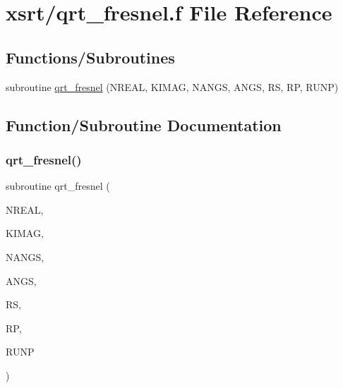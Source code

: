 \hypertarget{qrt__fresnel_8f}{}\section{xsrt/qrt\+\_\+fresnel.f File Reference}
\label{qrt__fresnel_8f}
\subsection*{Functions/\+Subroutines}
\begin{DoxyCompactItemize}
\item 
subroutine \hyperlink{qrt__fresnel_8f_af0d3a92968dea32a5708d958e28775b0}{qrt\+\_\+fresnel} (N\+R\+E\+AL, K\+I\+M\+AG, N\+A\+N\+GS, A\+N\+GS, RS, RP, R\+U\+NP)
\end{DoxyCompactItemize}


\subsection{Function/\+Subroutine Documentation}
\mbox{\label{qrt__fresnel_8f_af0d3a92968dea32a5708d958e28775b0}} 
\subsubsection{\texorpdfstring{qrt\+\_\+fresnel()}{qrt\_fresnel()}}
{\footnotesize\ttfamily subroutine qrt\+\_\+fresnel (\begin{DoxyParamCaption}\item[{double precision}]{N\+R\+E\+AL,  }\item[{double precision}]{K\+I\+M\+AG,  }\item[{integer}]{N\+A\+N\+GS,  }\item[{double precision, dimension(nangs)}]{A\+N\+GS,  }\item[{double precision, dimension(nangs)}]{RS,  }\item[{double precision, dimension(nangs)}]{RP,  }\item[{double precision, dimension(nangs)}]{R\+U\+NP }\end{DoxyParamCaption})}

